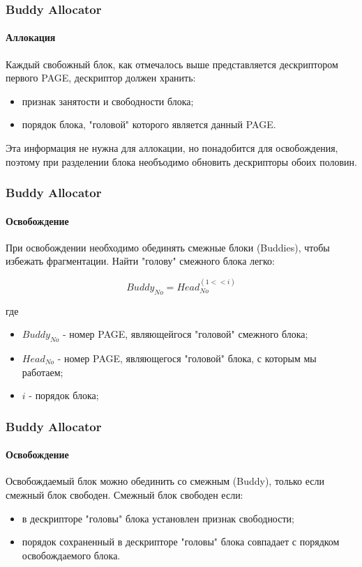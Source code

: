 \begin{frame}
\frametitle{Buddy Allocator}
\framesubtitle{Аллокация}

Каждый свобожный блок, как отмечалось выше представляется дескриптором первого PAGE, дескриптор должен хранить:

\begin{itemize}
  \item признак занятости и свободности блока;
  \item порядок блока, "головой" которого является данный PAGE.
\end{itemize}

Эта информация не нужна для аллокации, но понадобится для освобождения, поэтому
при разделении блока необъодимо обновить дескрипторы обоих половин.

\end{frame}

\begin{frame}
\frametitle{Buddy Allocator}
\framesubtitle{Освобождение}

При освобождении необходимо обединять смежные блоки (Buddies), чтобы избежать фрагментации. Найти "голову" смежного блока легко:

\[
	Buddy_{No} = Head_{No} ^ (1 << i)
\]

где
\begin{itemize}
  \item $Buddy_{No}$ - номер PAGE, являющейгося "головой" смежного блока;
  \item $Head_{No}$ - номер PAGE, являющегося "головой" блока, с которым мы работаем;
  \item $i$ - порядок блока;
\end{itemize}

\end{frame}

\begin{frame}
\frametitle{Buddy Allocator}
\framesubtitle{Освобождение}

Освобождаемый блок можно обединить со смежным (Buddy), только если смежный блок свободен. Смежный блок свободен если:

\begin{itemize}
  \item в дескрипторе "головы" блока установлен признак свободности;
  \item порядок сохраненный в дескрипторе "головы" блока совпадает с порядком освобождаемого блока.
\end{itemize}
\end{frame}

